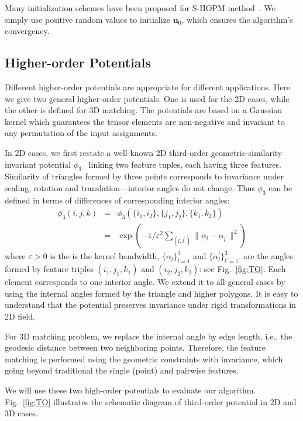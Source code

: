 Many initialization schemes have been proposed for S-HOPM method~\cite{Kofidis02}.
We simply use positive random values to initialize $\boldsymbol{u}_0$, which ensures the algorithm's convergency.

\subsection{Higher-order Potentials}
\label{subsec:potentials}

Different higher-order potentials are appropriate for different applications.
Here we give two general higher-order potentials.
One is used for the 2D cases, while the other is defined for 3D matching.
The potentials are based on a Gaussian kernel which guarantees the tensor elements are non-negative and invariant to any permutation of the input assignments.

In 2D cases, we first restate a well-known 2D third-order geometric-similarity invariant potential $\phi_3$~\cite{Duchenne_etal09,Chertok10} linking two feature tuples,
each having three features.
Similarity of triangles formed by three points corresponds to invariance under scaling, rotation and translation---interior angles do not change.
Thus $\phi_3$ can be defined in terms of differences of corresponding interior angles:
\begin{eqnarray}
\phi_3(i,j,k)&=&\phi_3(\{i_1,i_2\}, \{j_1,j_2\}, \{k_1,k_2\})\nonumber\\
&=&\exp(-1/\varepsilon^2\sum\nolimits_{(l,l^{'})}\lVert \alpha_l- \alpha_{l^{'} } \lVert^2 )
\end{eqnarray}
where $\varepsilon > 0$ is the is the kernel bandwidth,
$\{\alpha_l\}_{l=1}^3$ and $\{\alpha_l^{'}\}_{l^{'}=1^{'}}^{3}$ are the angles formed by feature triples $(i_1,j_1,k_1)$ and $(i_2,j_2,k_2)$:
see Fig.~\ref{fig:TO}. Each element corresponds to one interior angle.
We extend it to all general cases by using the internal angles formed by the triangle and higher polygons.
It is easy to understand that the potential preserves invariance under rigid transformations in 2D field.

For 3D matching problem, we replace the internal angle by edge length, i.e., the geodesic distance between two neighboring points.
Therefore, the feature matching is performed using the geometric constraints with invariance,
which going beyond traditional the single (point) and pairwise features.

We will use these two high-order potentials to evaluate our algorithm.
Fig.~\ref{fig:TO} illustrates the schematic diagram of third-order potential in 2D and 3D cases.


